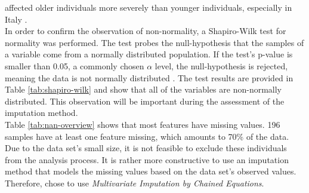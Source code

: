 affected older individuals more severely than younger individuals, especially 
in Italy \cite{RN193}. 
\\
In order to confirm the observation of non-normality, a Shapiro-Wilk test for 
normality was performed.
The test probes the null-hypothesis that the samples of a variable come from a 
normally distributed population. If the test's p-value is smaller than 
0.05, a commonly chosen $\alpha$ level, the null-hypothesis is rejected, 
meaning the data is not normally distributed \cite{RN196}.
The test results are provided in Table \ref{tab:shapiro-wilk} and show 
that all of the variables are non-normally distributed. This observation will 
be important during the assessment of the imputation method.
\\
Table \ref{tab:nan-overview} shows that most features have missing values. 196 
samples have at least one feature missing, which amounts to 70\% of the data. 
Due to the data set's small size, it is not feasible to exclude these 
individuals from the analysis process. It is rather more constructive to use an 
imputation method that models the missing values based on the data set's 
observed values. Therefore, \citeauthor{RN127} chose to use 
\textit{Multivariate 
Imputation by Chained Equations}. 
